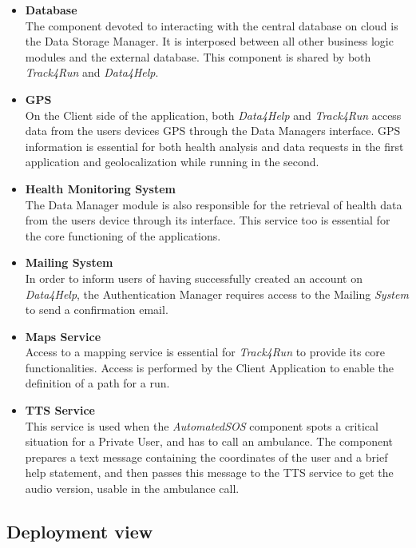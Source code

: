 \documentclass[titlepage]{article}
\begin{document}
	\begin{itemize}
		\item {\bf Database }\\
		The component devoted to interacting with the central database on cloud is the Data Storage Manager. It is interposed between all other business logic modules and the external database. This component is shared by both {\it Track4Run} and {\it Data4Help}.
		\item {\bf GPS }\\
		On the Client side of the application, both {\it Data4Help} and {\it Track4Run} access data from the user\textsc{}s device\textsc{}s GPS through the Data Managers\textsc{} interface. GPS information is essential for both health analysis and data requests in the first application and geolocalization while running in the second.
		\item {\bf Health Monitoring System }\\
		The Data Manager module is also responsible for the retrieval of health data from the user\textsc{}s device through its interface. This service too is essential for the core functioning of the applications.
		\item {\bf Mailing System }\\
		In order to inform users of having successfully created an account on {\it Data4Help}, the Authentication Manager requires access to the Mailing {\it System} to send a confirmation email.
		\item {\bf Maps Service }\\
		Access to a mapping service is essential for {\it Track4Run} to provide its core functionalities. Access is performed by the Client Application to enable the definition of a path for a run.
		\item {\bf TTS Service }\\
		This service is used when the {\it AutomatedSOS} component spots a critical situation for a Private User, and has to call an ambulance. The component prepares a text message containing the coordinates of the user and a brief help statement, and then passes this message to the TTS service to get the audio version, usable in the ambulance call.
	\end{itemize} 
	
	\pagebreak
	
	\subsection{Deployment view}
	
\end{document}
